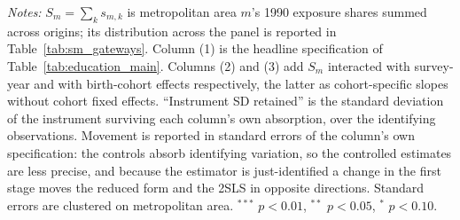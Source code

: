 \begin{table}[!htbp]
\centering
\caption{Sensitivity to the \citet{borusyak2022quasi} Sum-of-Shares Control}
\label{tab:bhj_incomplete_shares}
\begin{minipage}{\textwidth}
\footnotesize
\vspace{4pt}
\textit{Notes:} $S_m = \sum_k s_{m,k}$ is metropolitan area $m$'s 1990 exposure shares summed across origins; its distribution across the panel is reported in Table~\ref{tab:sm_gateways}. Column (1) is the headline specification of Table~\ref{tab:education_main}. Columns (2) and (3) add $S_m$ interacted with survey-year and with birth-cohort effects respectively, the latter as cohort-specific slopes without cohort fixed effects. ``Instrument SD retained'' is the standard deviation of the instrument surviving each column's own absorption, over the identifying observations. Movement is reported in standard errors of the column's own specification: the controls absorb identifying variation, so the controlled estimates are less precise, and because the estimator is just-identified a change in the first stage moves the reduced form and the 2SLS in opposite directions. Standard errors are clustered on metropolitan area. $^{***}$ $p<0.01$, $^{**}$ $p<0.05$, $^{*}$ $p<0.10$.
\end{minipage}
\end{table}

